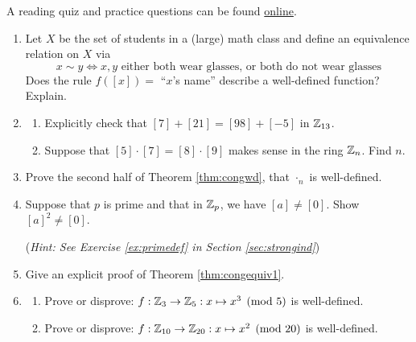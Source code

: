 \begin{exercises}{}{}
	A reading quiz and practice questions can be found \href{http://www.math.uci.edu/~ndonalds/math13/selftest/7-4-welldefn.html}{online}.

\begin{enumerate}
  \item Let $X$ be the set of students in a (large) math class and define an equivalence relation on $X$ via
  \[
  	x\sim y\iff x,y\text{ either both wear glasses, or both do not wear glasses}
  \]
  Does the rule $f([x])=$ ``$x$'s name'' describe a well-defined function? Explain.
  
  \item\begin{enumerate}
    \item Explicitly check that $[7]+[21]=[98]+[-5]$ in $\mathbb{Z}_{13}$.
    \item Suppose that $[5]\cdot[7]=[8]\cdot[9]$ makes sense in the ring $\mathbb{Z}_n$. Find $n$.
  \end{enumerate}
  
    \item Prove the second half of Theorem \ref{thm:congwd}, that $\cdot_n$ is well-defined.
  
  
  
  \item Suppose that $p$ is prime and that in $\mathbb{Z}_p$, we have $[a] \neq [0]$. Show $[a]^2 \neq [0]$.\par
  (\emph{Hint: See Exercise \ref{ex:primedef} in Section \ref{sec:strongind}})
  
  \item Give an explicit proof of Theorem \ref{thm:congequiv1}.
  



	\item\begin{enumerate}
	  	\item Prove or disprove: $f:\mathbb{Z}_3\to\mathbb{Z}_5:x\mapsto x^3\pmod 5$ is well-defined.
			\item Prove or disprove: $f:\mathbb{Z}_{10}\to\mathbb{Z}_{20}:x\mapsto x^2\pmod{20}$ is well-defined.
		\end{enumerate}
		

\end{enumerate}
\end{exercises}
